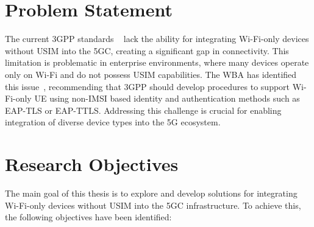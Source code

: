 \section{Problem Statement}

The current \ac{3GPP} standards ~\cite{33.501-p32} lack the ability for integrating Wi-Fi-only devices without \ac{USIM} into the \ac{5GC}, creating a significant gap in connectivity. This limitation is problematic in enterprise environments, where many devices operate only on Wi-Fi and do not possess \ac{USIM} capabilities. The \ac{WBA} has identified this issue~\cite{wba-04-2021-p59}, recommending that \ac{3GPP} should develop procedures to support Wi-Fi-only \ac{UE} using non-\acf{IMSI} based identity and authentication methods such as \acf{EAP-TLS} or \ac{EAP-TTLS}. Addressing this challenge is crucial for enabling integration of diverse device types into the \ac{5G} ecosystem.

\section{Research Objectives}

The main goal of this thesis is to explore and develop solutions for integrating Wi-Fi-only devices without \ac{USIM} into the \ac{5GC} infrastructure. To achieve this, the following objectives have been identified:

